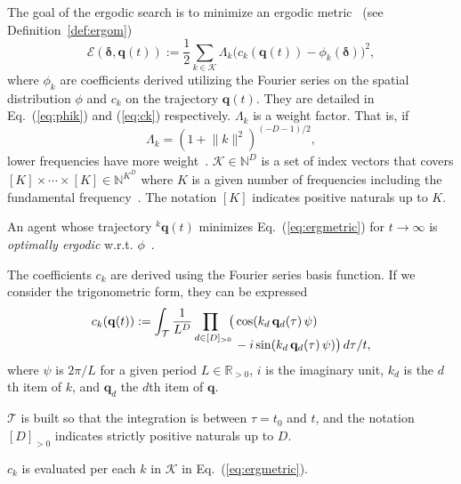 \documentclass[letterpaper,10pt,conference,twoside]{IEEEtran}
\theoremstyle{definition}
\begin{document}
The goal of the ergodic search is to minimize an ergodic metric~\cite{mathew2011metrics} (see Definition~\ref{def:ergom})
\begin{equation}\label{eq:ergmetric}
  \mathcal{E}(\boldsymbol{\delta},\mathbf{q}(t)):=\frac{1}{2}\sum_{k\in\mathcal{K}}\Lambda_k \big( c_k(\mathbf{q}(t))-\phi_k(\boldsymbol{\delta}) \big)^2,
\end{equation}
where $\phi_k$ are coefficients derived utilizing the Fourier series on the spatial distribution $\phi$ and $c_k$ on the trajectory $\mathbf{q}(t)$. They are detailed in Eq.~(\ref{eq:phik}) and (\ref{eq:ck}) respectively.
$\Lambda_k$ is a weight factor. That is, if 
\begin{equation}
  \Lambda_k=(1+\lVert k\rVert^2)^{(-D-1)/2},
\end{equation}
lower frequencies have more weight~\cite{miller2016ergodic}.
$\mathcal{K}\in\mathbb{N}^D$ is a set of index vectors that covers $[K]\times\cdots\times[K]\in\mathbb{N}^{K^D}$ 
where $K$ is a given number of frequencies including the fundamental frequency~\cite{calinon2020mixture}. The notation $[K]$ indicates positive naturals up to $K$.

An agent whose trajectory ${}^k\mathbf{q}(t)$ minimizes Eq.~(\ref{eq:ergmetric}) for $t\rightarrow\infty$ is \textit{optimally ergodic} w.r.t. $\phi$~\cite{abraham2018decentralized}.

The coefficients $c_k$ are derived using the Fourier series basis function. If we consider the trigonometric form, they can be expressed
\begin{equation}\label{eq:ck}
  \begin{split}
    c_k(\mathbf{q}(t)):=\int_{\mathcal{T}}\frac{1}{L^D}\prod_{d\in[D]_{>0}\hspace*{-1ex}}\big(& \cos(k_d\,\mathbf{q}_d(\tau)\,\psi)\\[-2ex]
    &\vspace*{-4ex}-i\sin(k_d\,\mathbf{q}_d(\tau)\,\psi) \big)\,d\tau/t,
  \end{split}
\end{equation}
where $\psi$ is $2\pi/L$ for a given period $L\in\mathbb{R}_{>0}$, $i$ is the imaginary unit, $k_d$ is the $d$th item of $k$, and $\mathbf{q}_d$ the $d$th item of $\mathbf{q}$.

$\mathcal{T}$ is built so that the integration is between $\tau=t_0$ and $t$, and the notation $[D]_{>0}$ indicates strictly positive naturals up to $D$.

$c_k$ is evaluated per each $k$ in $\mathcal{K}$ in Eq.~(\ref{eq:ergmetric}).
\end{document}
